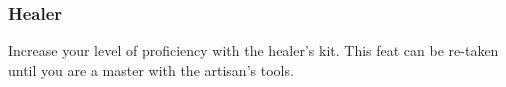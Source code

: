 %
%
%
%
%

\subsubsection{Healer} \label{feat::healer}
    Increase your level of proficiency with the healer's kit.
    This feat can be re-taken until you are a master with the artisan's tools.
